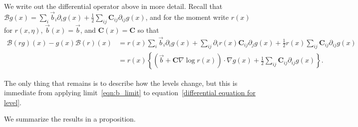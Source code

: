 \documentclass[EJP]{ejpecp} %
\newcommand{\grad}{\nabla}
\newcommand{\DG}{\mathcal{B}}  %
\newcommand{\meanq}{\vec b}    %
\newcommand{\covq}{\mathbf{C}}     %
\begin{document}
We write out the differential operator above in more detail.
Recall that $\DG g(x) = \sum_i \meanq_i \partial_i g(x) + \frac{1}{2}\sum_{ij} \covq_{ij} \partial_{ij} g(x)$,
and for the moment write $r(x)$ for $r(x, \eta)$, $\meanq(x) = \meanq$, and $\covq(x) = \covq$
so that
\begin{align}
\DG(rg)(x) - g(x) \DG(r)(x)
    &= \nonumber
    r(x) \sum_i \meanq_i \partial_i g(x)
    + \sum_{ij} \partial_i r(x) \covq_{ij} \partial_j g(x)
    + \frac{1}{2} r(x) \sum_{ij} \covq_{ij} \partial_{ij} g(x) \\
    &= \label{eqn:limiting_generator}
    r(x) \left\{
        \left(
        \meanq
        + \covq \grad \log r(x)
        \right)
        \cdot
        \grad g(x)
        +
        \frac{1}{2} \sum_{ij} \covq_{ij} \partial_{ij} g(x)
    \right\} .
\end{align}

The only thing that remains is to describe how the levels change,
but this is immediate from applying limit~\eqref{eqn:b_limit}
to equation~\eqref{differential equation for level}.

We summarize the results in a proposition.
\end{document}
